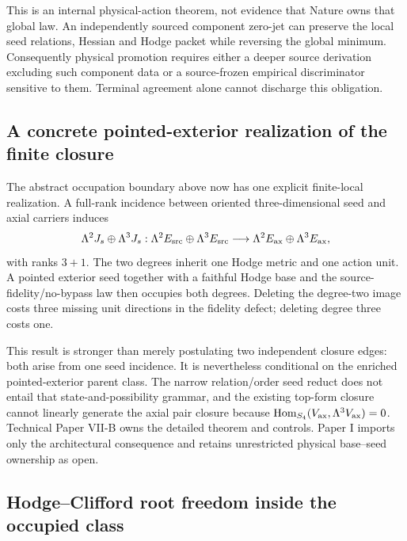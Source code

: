 \documentclass[11pt]{article}
\begin{document}
This is an internal physical-action theorem, not evidence that Nature owns
that global law.  An independently sourced component zero-jet can preserve
the local seed relations, Hessian and Hodge packet while reversing the global
minimum.  Consequently physical promotion requires either a deeper source
derivation excluding such component data or a source-frozen empirical
discriminator sensitive to them.  Terminal agreement alone cannot discharge
this obligation.

\subsection{A concrete pointed-exterior realization of the finite closure}

The abstract occupation boundary above now has one explicit finite-local
realization.  A full-rank incidence between oriented three-dimensional seed
and axial carriers induces
\[
 \Lambda^2J_s\oplus\Lambda^3J_s:
 \Lambda^2E_{\rm src}\oplus\Lambda^3E_{\rm src}
 \longrightarrow
 \Lambda^2E_{\rm ax}\oplus\Lambda^3E_{\rm ax},
\]
with ranks $3+1$.  The two degrees inherit one Hodge metric and one action
unit.  A pointed exterior seed together with a faithful Hodge base and the
source-fidelity/no-bypass law then occupies both degrees.  Deleting the
degree-two image costs three missing unit directions in the fidelity defect;
deleting degree three costs one.

This result is stronger than merely postulating two independent closure
edges: both arise from one seed incidence.  It is nevertheless conditional on
the enriched pointed-exterior parent class.  The narrow relation/order seed
reduct does not entail that state-and-possibility grammar, and the existing
top-form closure cannot linearly generate the axial pair closure because
$\operatorname{Hom}_{S_4}(V_{\rm ax},\Lambda^3V_{\rm ax})=0$.  Technical
Paper VII-B owns the detailed theorem and controls.  Paper I imports only the
architectural consequence and retains unrestricted physical base--seed
ownership as open.

\subsection{Hodge--Clifford root freedom inside the occupied class}
\end{document}
